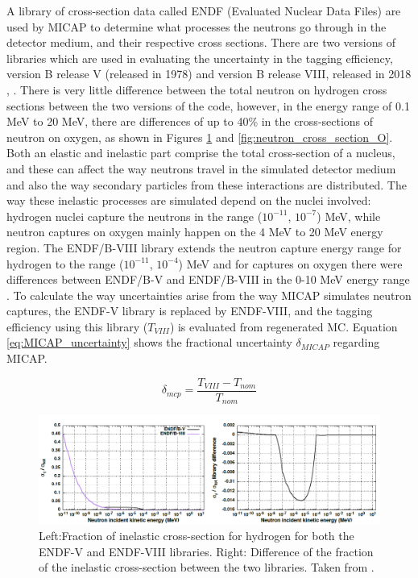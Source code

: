 A library of cross-section data called ENDF \cite{endf} (Evaluated Nuclear Data Files) are used by MICAP to determine what processes the neutrons go through in the detector medium, and their respective cross sections. There are two versions of libraries which are used in evaluating the uncertainty in the tagging efficiency, version B release V (released in 1978) and version B release VIII, released in 2018 \cite{endf8}, \cite{endf82}. There is very little difference between the total neutron on hydrogen cross sections between the two versions of the code, however, in the energy range of 0.1 MeV to 20 MeV, there are differences of up to 40\% in the cross-sections of neutron on oxygen, as shown in Figures \ref{fig:neutron_cross_section_H} and \ref{fig:neutron_cross_section_O}. Both an elastic and inelastic part comprise the total cross-section of a nucleus, and these can affect the way neutrons travel in the simulated detector medium and also the way secondary particles from these interactions are distributed. The way these inelastic processes are simulated depend on the nuclei involved: hydrogen nuclei capture the neutrons in the range ($10^{-11}$, $10^{-7}$) MeV, while neutron captures on oxygen mainly happen on the 4 MeV to 20 MeV energy region. The ENDF/B-VIII library extends the neutron capture energy range for hydrogen to the range ($10^{-11}$, $10^{-4}$) MeV and for captures on oxygen there were differences between ENDF/B-V and ENDF/B-VIII in the 0-10 MeV energy range \cite{akutsu_thesis}.  To calculate the way uncertainties arise from the way MICAP simulates neutron captures, the ENDF-V library is replaced by ENDF-VIII, and the tagging efficiency using this library ($T_{VIII}$) is evaluated from regenerated MC. Equation \ref{eq:MICAP_uncertainty} shows the fractional uncertainty $\delta_{MICAP}$ regarding MICAP.  

\begin{equation}
    \delta_{m c p}=\frac{T_{V I I I}-T_{n o m}}{T_{n o m}}
\label{eq:MICAP_uncertainty}
\end{equation}

\begin{figure}[!htb]
    \centering
    \includegraphics[width=\textwidth]{Figures/neutron_cross_section_endf_H.PNG}
\caption{Left:Fraction of inelastic cross-section for hydrogen for both the ENDF-V and ENDF-VIII libraries. Right: Difference of the fraction of the inelastic cross-section between the two libraries. Taken from \cite{tn415_fiacob}.}
\label{fig:neutron_cross_section_H}
\end{figure}

